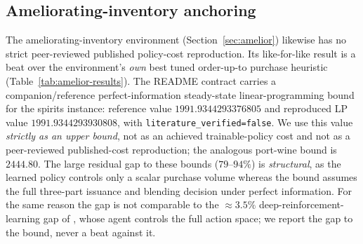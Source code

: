 \documentclass[11pt]{article}
\begin{document}
\subsection{Ameliorating-inventory anchoring}
\label{app:amelior-validation}

The ameliorating-inventory environment (Section~\ref{sec:amelior}) likewise has no strict
peer-reviewed published policy-cost reproduction. Its like-for-like result is a beat over the
environment's \emph{own} best tuned order-up-to purchase heuristic (Table~\ref{tab:amelior-results}).
The README contract carries a companion/reference perfect-information steady-state
linear-programming bound for the spirits instance: reference value $1991.9344293376805$ and reproduced
LP value $1991.9344293930808$, with \texttt{literature\_verified=false}. We use this value
\emph{strictly as an upper bound}, not as an achieved trainable-policy cost and not as a
peer-reviewed published-cost reproduction; the analogous port-wine bound is $2444.80$. The large
residual gap to these bounds ($79$--$94\%$) is \emph{structural}, as the learned policy controls only a
scalar purchase volume whereas the bound assumes the full three-part issuance and blending decision
under perfect information. For the same reason the gap is not comparable to the ${\approx}3.5\%$
deep-reinforcement-learning gap of \citet{pahrGrunow2025}, whose agent controls the full action
space; we report the gap to the bound, never a beat against it.
\end{document}
